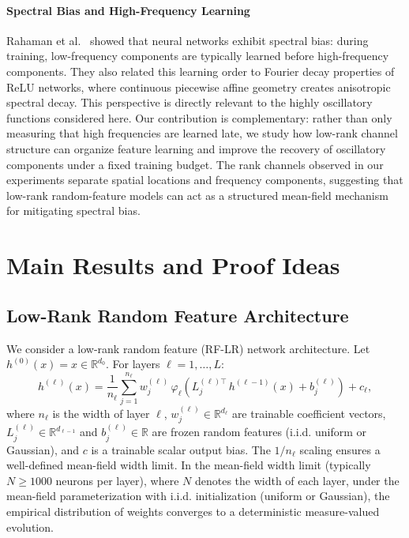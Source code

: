 \documentclass[nohyperref]{article}
\theoremstyle{plain}
\theoremstyle{definition}
\theoremstyle{remark}
\begin{document}
\paragraph{Spectral Bias and High-Frequency Learning}

Rahaman et al.~\cite{rahaman2019spectral} showed that neural networks exhibit spectral bias: during training, low-frequency components are typically learned before high-frequency components. They also related this learning order to Fourier decay properties of ReLU networks, where continuous piecewise affine geometry creates anisotropic spectral decay. This perspective is directly relevant to the highly oscillatory functions considered here. Our contribution is complementary: rather than only measuring that high frequencies are learned late, we study how low-rank channel structure can organize feature learning and improve the recovery of oscillatory components under a fixed training budget. The rank channels observed in our experiments separate spatial locations and frequency components, suggesting that low-rank random-feature models can act as a structured mean-field mechanism for mitigating spectral bias.













\section{Main Results and Proof Ideas}
\label{sec:theory}

\subsection{Low-Rank Random Feature Architecture}
\label{sec:setup}

We consider a low-rank random feature (RF-LR) network architecture. Let $h^{(0)}(x) = x \in \mathbb{R}^{d_0}$. For layers $\ell = 1, \ldots, L$:
\begin{equation}
\label{eq:RF-LR}
h^{(\ell)}(x) = \frac{1}{n_\ell} \sum_{j=1}^{n_\ell} w^{(\ell)}_j\,\varphi_\ell\!\left(L^{(\ell)\top}_j\,h^{(\ell-1)}(x) + b^{(\ell)}_j\right) + c_{\ell},
\end{equation}
where $n_\ell$ is the width of layer $\ell$, $w^{(\ell)}_j \in \mathbb{R}^{d_\ell}$ are trainable coefficient vectors, $L^{(\ell)}_j \in \mathbb{R}^{d_{\ell-1}}$ and $b^{(\ell)}_j \in \mathbb{R}$ are frozen random features (i.i.d. uniform or Gaussian), and $c$ is a trainable scalar output bias. The $1/n_\ell$ scaling ensures a well-defined mean-field width limit. In the mean-field width limit (typically $N \ge 1000$ neurons per layer), where $N$ denotes the width of each layer, under the mean-field parameterization with i.i.d. initialization (uniform or Gaussian), the empirical distribution of weights converges to a deterministic measure-valued evolution.
\end{document}
